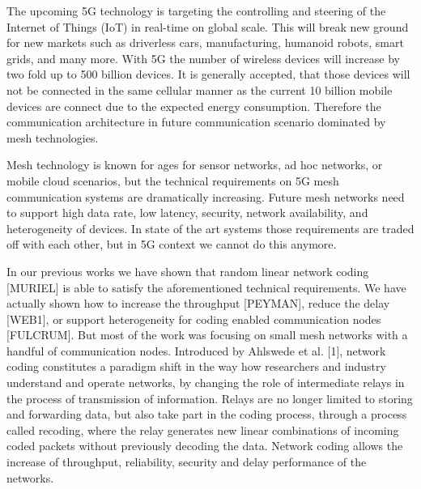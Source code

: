 %

The upcoming 5G technology is targeting the controlling and steering of the Internet of Things (IoT) in real-time on global scale. This will break new ground for new markets such as driverless cars, manufacturing, humanoid robots, smart grids, and many more. With 5G the number of wireless devices will increase by two fold up to 500 billion devices. It is generally accepted, that those devices will not be connected in the same cellular manner as the current 10 billion mobile devices are connect due to the expected energy consumption. Therefore the communication architecture in future communication scenario dominated by mesh technologies.

Mesh technology is known for ages for sensor networks, ad hoc networks, or mobile cloud scenarios, but the technical requirements on 5G mesh communication systems are dramatically increasing. Future mesh networks need to support high data rate, low latency, security, network availability, and heterogeneity of devices. In state of the art systems those requirements are traded off with each other, but in 5G context we cannot do this anymore.

In our previous works we have shown that random linear network coding [MURIEL] is able to satisfy the aforementioned technical requirements. We have actually shown how to increase the throughput [PEYMAN], reduce the delay [WEB1], or support heterogeneity for coding enabled communication nodes [FULCRUM]. But most of the work was focusing on small mesh networks with a handful of communication nodes. Introduced by Ahlswede et al. [1], network coding constitutes a paradigm shift in the way how researchers and industry understand and operate networks, by changing the role of intermediate relays in the process of transmission of information. Relays are no longer limited to storing and forwarding data, but also take part in the coding process, through a process called recoding, where the relay generates new linear combinations of incoming coded packets without previously decoding the data. Network coding allows the increase of throughput, reliability, security and delay performance of the networks.

